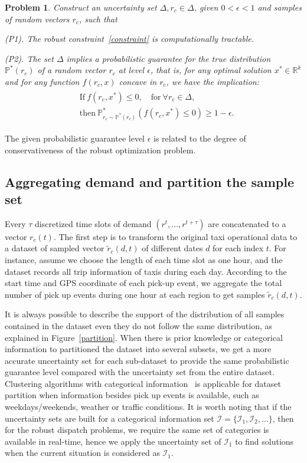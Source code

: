 \documentclass[10pt,twocolumn,twoside,english]{IEEEtran}
\newtheorem{problem}{Problem}
\begin{document}
\begin{problem}
Construct an uncertainty set $\Delta, r_c\in \Delta$, given $0<\epsilon<1$ and samples of random vectors $r_c$, such that

(P1). The robust constraint~\eqref{constraint} is computationally tractable.

(P2). The set $\Delta$ implies a probabilistic guarantee for the true distribution $\mathbb{P}^*({r}_c)$ of a random vector ${r}_c$ at level $\epsilon$, that is, for any optimal solution $x^* \in \mathbb{R}^k$ and for any function $f(r_c,x)$ concave in $r_c$, we have the implication:
\begin{align}
\begin{split}
&\text{If}\ f(r_c,x^*)  \leq 0,\quad \text{for}\ \forall r_c\in\Delta,\\ 
 &\text{then}\ \mathbb{P}_{r_c \sim \mathbb{P}^*(r_c)}^*(f({r}_c, x^*)\leqslant 0) \geq 1-\epsilon. 
\end{split}
\label{epsilon}
\end{align} 
\label{prob_1}
\end{problem}
\vspace{-8pt}
The given probabilistic guarantee level $\epsilon$ is related to the degree of conservativeness of the robust optimization problem. 

\subsection{Aggregating demand and partition the sample set}
Every $\tau$ discretized time slots of demand $(r^t, \dots, r^{t+\tau})$ are concatenated to a vector $r_c (t)$. The first step is to transform the original taxi operational data to a dataset of sampled vector $\tilde{r}_c(d,t)$ of different dates $d$ for each index $t$. For instance, assume we choose the length of each time slot as one hour, and the dataset records all trip information of taxis during each day. According to the start time and GPS coordinate of each pick-up event, we aggregate the total number of pick up events during one hour at each region to get samples $\tilde{r}_c(d,t)$. 


It is always possible to describe the support of the distribution of all samples contained in the dataset even they do not follow the same distribution, as explained in Figure~\ref{partition}. When there is prior knowledge or categorical information to partitioned the dataset into several subsets, we get a more accurate uncertainty set for each sub-dataset to provide the same probabilistic guarantee level compared with the uncertainty set from the entire dataset. Clustering algorithms with categorical information~\cite{Huang_kmodes} is applicable for dataset partition when information besides pick up events is available, such as weekdays/weekends, weather or traffic conditions.  It is worth noting that if the uncertainty sets are built for a categorical information set $\mathcal{I}=\{\mathcal{I}_1, \mathcal{I}_2,\dots\}$, then for the robust dispatch problems, we require the same set of categories is available in real-time, hence we apply the uncertainty set of $\mathcal{I}_1$ to find solutions when the current situation is considered as $\mathcal{I}_1$. 
\end{document}
